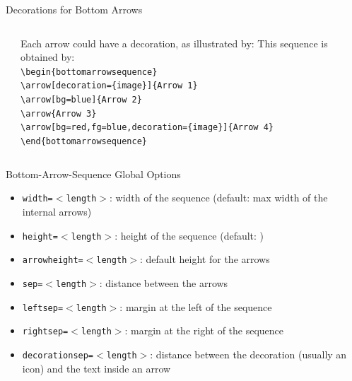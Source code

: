 \documentclass[english,sectioncirclenumberstyle]{ciadbeamer}
\begin{document}
\begin{frame}[t]{Decorations for Bottom Arrows}
	\begin{columns}
		\begin{column}{.2\linewidth}
			\begin{bottomarrowsequence}
			\end{bottomarrowsequence}
		\end{column}
		\begin{column}{.8\linewidth}
			Each arrow could have a decoration, as illustrated by:
			\vspace{.5cm}
			This sequence is obtained by: \\
			\texttt{{\textbackslash}begin\{bottomarrowsequence\}} \\
			\hspace{.5cm}\texttt{{\textbackslash}arrow[decoration=\{image\}]\{Arrow 1\}} \\
			\hspace{.5cm}\texttt{{\textbackslash}arrow[bg=blue]\{Arrow 2\}} \\
			\hspace{.5cm}\texttt{{\textbackslash}arrow\{Arrow 3\}} \\
			\hspace{.5cm}\texttt{{\textbackslash}arrow[bg=red,fg=blue,decoration=\{image\}]\{Arrow 4\}} \\
			\texttt{{\textbackslash}end\{bottomarrowsequence\}}
		\end{column}
	\end{columns}
\end{frame}

\begin{frame}{{Bottom-Arrow-Sequence} Global Options}
	\begin{itemize}
	\item \texttt{width=\ensuremath{<}length\ensuremath{>}}: width of the sequence (default: max width of the internal arrows)
	\item \texttt{height=\ensuremath{<}length\ensuremath{>}}: height of the sequence (default: \the\linewidth)
	\item \texttt{arrowheight=\ensuremath{<}length\ensuremath{>}}: default height for the arrows
	\item \texttt{sep=\ensuremath{<}length\ensuremath{>}}: distance between the arrows
	\item \texttt{leftsep=\ensuremath{<}length\ensuremath{>}}: margin at the left of the sequence
	\item \texttt{rightsep=\ensuremath{<}length\ensuremath{>}}: margin at the right of the sequence
	\item \texttt{decorationsep=\ensuremath{<}length\ensuremath{>}}: distance between the decoration (usually an icon) and the text inside an arrow
	\end{itemize}
\end{frame}
\end{document}
